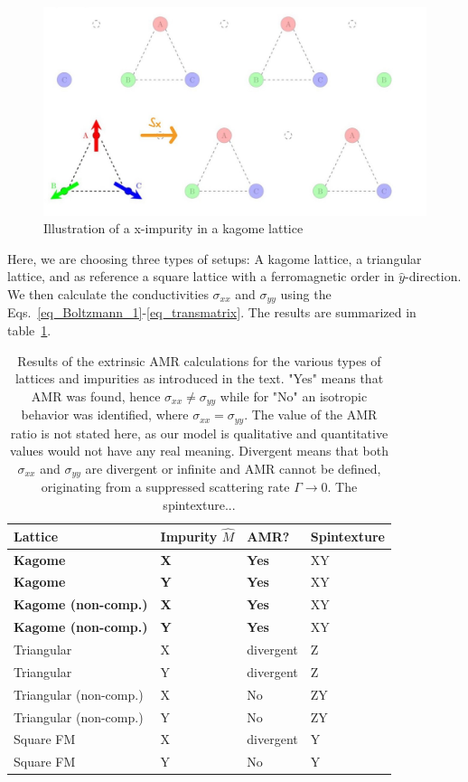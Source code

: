 \documentclass[prb,showpacs,amsmath,amssymb,superscriptaddress,twocolumn,floatfix]{revtex4-1}
\begin{document}
\begin{figure}
	\centering
	\includegraphics[width=0.8\linewidth]{img/Kagome_21}
	\caption{Illustration of a x-impurity in a kagome lattice}
	\label{fig:kagome21}
\end{figure}


Here, we are choosing three types of setups: A kagome lattice, a triangular lattice, and as reference a square lattice with a ferromagnetic order in $\hat{y}$-direction. We then calculate the conductivities $\sigma_{xx}$ and $\sigma_{yy}$ using the Eqs.~\ref{eq_Boltzmann_1}-\ref{eq_transmatrix}. The results are summarized in table~\ref{T_extrinsic}.

\begin{table}
	\begin{tabular}{llll}
	Lattice & Impurity $\hat{M}$ & AMR? & Spintexture \\
	\hline 
	\textbf{Kagome} & \textbf{X} & \textbf{Yes} & XY\\
	\textbf{Kagome} & \textbf{Y} & \textbf{Yes} & XY \\
	\textbf{Kagome (non-comp.)} & \textbf{X} & \textbf{Yes} & XY\\
	\textbf{Kagome (non-comp.)} & \textbf{Y} & \textbf{Yes} & XY \\
	\hline 
	Triangular & X & divergent & Z \\
	Triangular & Y & divergent & Z \\
	Triangular (non-comp.) & X & No & ZY \\
    Triangular (non-comp.) & Y & No & ZY \\
	\hline
	Square FM & X & divergent & Y\\
	Square FM & Y & No & Y
\end{tabular}
\caption{Results of the extrinsic AMR calculations for the various types of lattices and impurities as introduced in the text. "Yes" means that AMR was found, hence $\sigma_{xx} \neq \sigma_{yy}$ while for "No" an isotropic behavior was identified, where $\sigma_{xx} = \sigma_{yy}$. The value of the AMR ratio is not stated here, as our model is qualitative and quantitative values would not have any real meaning. Divergent means that both $\sigma_{xx}$ and $\sigma_{yy}$ are divergent or infinite and AMR cannot be defined, originating from a suppressed scattering rate $\Gamma \rightarrow 0$. {\color{red} The spintexture...}}
\label{T_extrinsic}
\end{table}
\end{document}
